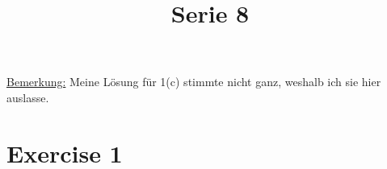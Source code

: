 \documentclass[10pt]{article}\usepackage[]{graphicx}\usepackage[]{color}
\title{Serie 8}
\date{}
\author{}
\begin{document}
\maketitle

\uline{Bemerkung:} Meine Lösung für 1(c) stimmte nicht ganz,
weshalb ich sie hier auslasse.


\section*{Exercise 1}
\end{document}
